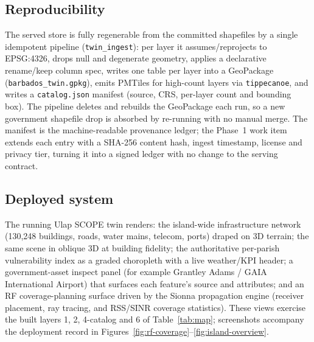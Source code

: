 \documentclass[10pt,twocolumn]{article}
\begin{document}
\subsection{Reproducibility}
The served store is fully regenerable from the committed shapefiles by a single
idempotent pipeline (\texttt{twin\_ingest}): per layer it assumes/reprojects to
EPSG:4326, drops null and degenerate geometry, applies a declarative rename/keep
column spec, writes one table per layer into a GeoPackage
(\texttt{barbados\_twin.gpkg}), emits PMTiles for high-count layers via
\texttt{tippecanoe}, and writes a \texttt{catalog.json} manifest (source, CRS,
per-layer count and bounding box). The pipeline deletes and rebuilds the GeoPackage
each run, so a new government shapefile drop is absorbed by re-running with no manual
merge. The manifest is the machine-readable provenance ledger; the Phase~1 work item
extends each entry with a SHA-256 content hash, ingest timestamp, license and privacy
tier, turning it into a signed ledger with no change to the serving contract.

\subsection{Deployed system}
\label{sec:deployed-system}
The running Ulap SCOPE twin renders: the island-wide infrastructure network
(130{,}248 buildings, roads, water mains, telecom, ports) draped on 3D terrain; the
same scene in oblique 3D at building fidelity; the authoritative per-parish
vulnerability index as a graded choropleth with a live weather/KPI header; a
government-asset inspect panel (for example Grantley Adams / GAIA International
Airport) that surfaces each feature's source and attributes; and an RF
coverage-planning surface driven by the Sionna propagation engine (receiver
placement, ray tracing, and RSS/SINR coverage statistics). These views exercise the
built layers 1, 2, 4-catalog and 6 of Table~\ref{tab:map}; screenshots accompany the
deployment record in Figures~\ref{fig:rf-coverage}--\ref{fig:island-overview}.
\end{document}
